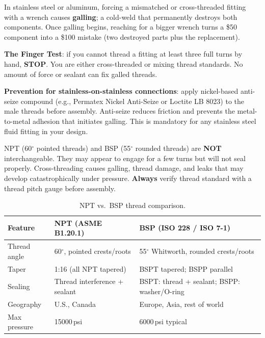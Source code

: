 \documentclass[11pt,letterpaper,twoside,openany]{book}
\providecommand{\ang}[1]{#1\ensuremath{{}^{\circ}}}
\begin{document}
\begin{warningbox}
In stainless steel or aluminum, forcing a mismatched or cross-threaded fitting with a wrench causes \textbf{galling}; a cold-weld that permanently destroys both components. Once galling begins, reaching for a bigger wrench turns a \$50 component into a \$100 mistake (two destroyed parts plus the replacement).

\textbf{The Finger Test}: if you cannot thread a fitting at least three full turns by hand, \textbf{STOP}. You are either cross-threaded or mixing thread standards. No amount of force or sealant can fix galled threads.

\textbf{Prevention for stainless-on-stainless connections}: apply nickel-based anti-seize compound (e.g., Permatex Nickel Anti-Seize or Loctite LB 8023) to the male threads before assembly. Anti-seize reduces friction and prevents the metal-to-metal adhesion that initiates galling. This is mandatory for any stainless steel fluid fitting in your design.
\end{warningbox}

\begin{warningbox}
NPT (\ang{60} pointed threads) and BSP (\ang{55} rounded threads) are \textbf{NOT} interchangeable. They may appear to engage for a few turns but will not seal properly. Cross-threading causes galling, thread damage, and leaks that may develop catastrophically under pressure. \textbf{Always} verify thread standard with a thread pitch gauge before assembly.
\end{warningbox}

\begin{table}[htbp]
\centering
\small
\begin{tabularx}{\textwidth}{l X X}
  \toprule
  \textbf{Feature} & \textbf{NPT (ASME B1.20.1)} & \textbf{BSP (ISO 228 / ISO 7-1)} \\
  \midrule
  Thread angle & \ang{60}, pointed crests/roots & \ang{55} Whitworth, rounded crests/roots \\
  Taper & 1:16 (all NPT tapered) & BSPT tapered; BSPP parallel \\
  Sealing & Thread interference + sealant & BSPT: thread + sealant; BSPP: washer/O-ring \\
  Geography & U.S., Canada & Europe, Asia, rest of world \\
  Max pressure & 15000\,psi & 6000\,psi typical \\
  \bottomrule
\end{tabularx}
\caption{NPT vs.\ BSP thread comparison.}
\end{table}
\end{document}
